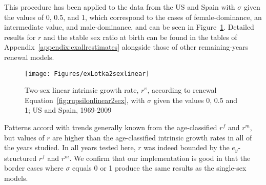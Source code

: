 \FloatBarrier
This procedure has been applied to the data from the US and Spain with $\sigma$
given the values of 0, 0.5, and 1, which correspond to the cases of
female-dominance, an intermediate value, and male-dominance, 
and can be seen in Figure~\ref{fig:rupsilonlinear2sex}. Detailed results for $r$ and
the stable sex ratio at birth can be found in the tables of
Appendix~\ref{appendix:exallrestimates} alongside those of other remaining-years renewal models.

\begin{figure}[!ht]
  \centering
    \caption{Two-sex linear intrinsic growth rate, $r^\upsilon$, according to
    renewal Equation~\eqref{fig:rupsilonlinear2sex}, with $\sigma$ given the
    values 0, 0.5 and 1; US and Spain, 1969-2009}
     \texttt{[image: Figures/exLotka2sexlinear]}
     \label{fig:rupsilonlinear2sex}
\end{figure}

Patterns accord with trends generally known from the age-classified $r^f$ and
$r^m$, but values of $r$ are higher than the
age-classified intrinsic growth rates in all of the years studied. In all years
tested here, $r$ was indeed bounded by the $e_y$-structured $r^f$ and $r^m$.
We confirm that our implementation is good in that the border cases
where $\sigma$ equals 0 or 1 produce the same results as the single-sex models.

\FloatBarrier
